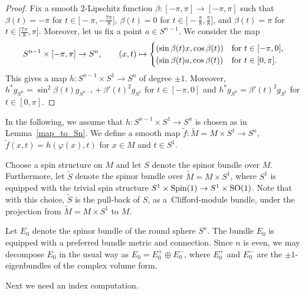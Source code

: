 \documentclass[pdftex]{sigma}
\numberwithin{equation}{section}
\begin{document}
\begin{proof}
Fix a smooth $2$-Lipschitz function $\beta\colon [-\pi,\pi] \to [-\pi,\pi]$ such that $\beta(t) = -\pi$ for $t \in \bigl[-\pi,-\frac{7\pi}{8}\bigr]$, $\beta(t) = 0$ for $t \in \bigl[-\frac{\pi}{8},\frac{\pi}{8}\bigr]$, and $\beta(t) = \pi$ for $t \in \big[\frac{7\pi}{8},\pi\big]$. Moreover, let us fix a point $a \in S^{n-1}$. We consider the map
\[
 S^{n-1} \times [-\pi,\pi] \to S^n,\qquad (x,t) \mapsto \begin{cases} (\sin \beta(t) x,\cos \beta(t)) & \text{\rm for $t \in [-\pi,0]$}, \\
 (\sin \beta(t) a,\cos \beta(t)) & \text{\rm for $t \in [0,\pi]$.} \end{cases}
 \]
This gives a map $h\colon S^{n-1} \times S^1 \to S^n$ of degree $\pm 1$. Moreover, $h^* g_{S^n} = \sin^2 \beta(t) g_{S^{n-1}} + \beta'(t)^2 g_{S^1}$ for $t \in [-\pi,0]$ and $h^* g_{S^n} = \beta'(t)^2 g_{S^1}$ for $t \in [0,\pi]$.
\end{proof}

In the following, we assume that $h\colon S^{n-1} \times S^1 \to S^n$ is chosen as in Lemma~\ref{map_to_Sn}. We define a smooth map $\tilde{f}\colon \tilde{M} = M \times S^1\to S^n$, $
\tilde{f}(x,t) = h(\varphi(x),t)$ for $x \in M$ and $t \in S^1$.

Choose a spin structure on $M$ and let $S$ denote the spinor bundle over $M$. Furthermore, let $\tilde{S}$ denote the spinor bundle over $\tilde{M} = M \times S^1$, where $S^1$ is equipped with the trivial spin structure $S^1 \times {\rm Spin}(1) \to S^1 \times {\rm SO}(1)$.
Note that with this choice, $\tilde{S}$ is the pull-back of $S$, as a~Clifford-module bundle, under the projection from $\tilde{M} = M \times S^1$ to $M$.

Let $E_0$ denote the spinor bundle of the round sphere $S^n$.
The bundle $E_0$ is equipped with a preferred bundle metric and connection.
Since $n$ is even, we may decompose $E_0$ in the usual way as $E_0 = E_0^+ \oplus E_0^-$, where $E_0^+$ and $E_0^-$ are the $\pm 1$-eigenbundles of the complex volume form.

Next we need an index computation.
\end{document}
